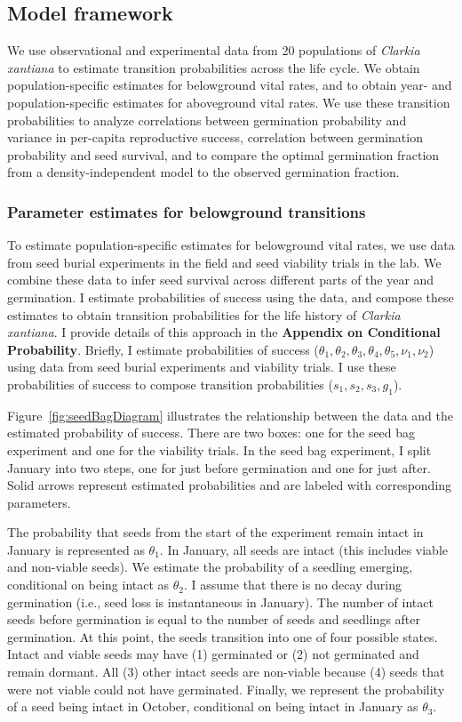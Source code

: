 \documentclass[12pt, oneside, titlepage]{article}   	%
\begin{document}
\subsection*{Model framework}

We use observational and experimental data from 20 populations of \textit{Clarkia xantiana} to estimate transition probabilities across the life cycle. We obtain population-specific estimates for belowground vital rates, and to obtain year- and population-specific estimates for aboveground vital rates. We use these transition probabilities to analyze correlations between germination probability and variance in per-capita reproductive success, correlation between germination probability and seed survival, and to compare the optimal germination fraction from a density-independent model to the observed germination fraction. 

\subsubsection*{Parameter estimates for belowground transitions}

To estimate population-specific estimates for belowground vital rates, we use data from seed burial experiments in the field and seed viability trials in the lab. We combine these data to infer seed survival across different parts of the year and germination. I estimate probabilities of success using the data, and compose these estimates to obtain transition probabilities for the life history of \textit{Clarkia xantiana}. I provide details of this approach in the \textbf{Appendix on Conditional Probability}. Briefly, I estimate probabilities of success ($\theta_1, \theta_2, \theta_3, \theta_4, \theta_5, \nu_1, \nu_2$) using data from seed burial experiments and viability trials. I use these probabilities of success to compose transition probabilities ($s_1, s_2, s_3, g_1$).

Figure~\ref{fig:seedBagDiagram} illustrates the relationship between the data and the estimated probability of success. There are two boxes: one for the seed bag experiment and one for the viability trials. In the seed bag experiment, I split January into two steps, one for just before germination and one for just after. Solid arrows represent estimated probabilities and are labeled with corresponding parameters.
 
The probability that seeds from the start of the experiment remain intact in January is represented as $\theta_1$. In January, all seeds are intact (this includes viable and non-viable seeds). We estimate the probability of a seedling emerging, conditional on being intact as $\theta_2$. I assume that there is no decay during germination (i.e., seed loss is instantaneous in January). The number of intact seeds before germination is equal to the number of seeds and seedlings after germination. At this point, the seeds transition into one of four possible states. Intact and viable seeds may have (1) germinated or (2) not germinated and remain dormant. All (3) other intact seeds are non-viable because (4) seeds that were not viable could not have germinated. Finally, we represent the probability of a seed being intact in October, conditional on being intact in January as $\theta_3$.
\end{document}
